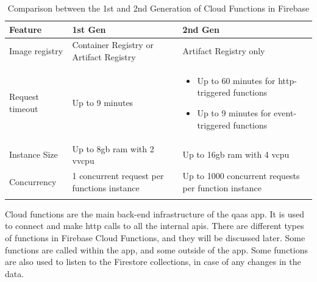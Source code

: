 \begin{longtable}{|p{5cm}|p{5.5cm}|p{5.5cm}|}
      \hline
      \rowcolor{blue!20}
      Feature         & 1st Gen                                                     & 2nd Gen                                                       \\
      \endfirsthead
      \hline
      Image registry  & Container Registry or Artifact Registry                     & Artifact Registry only                                        \\
      \hline
      Request timeout & Up to 9 minutes                                             & \begin{itemize}
                                                                                            \item Up to 60 minutes for \acrshort{http}-triggered functions
                                                                                            \item Up to 9 minutes for event-triggered functions
                                                                                      \end{itemize} \\
      \hline
      Instance Size   & Up to 8\acrshort{gb} \acrshort{ram} with 2 v\acrshort{vcpu} & Up to 16\acrshort{gb} \acrshort{ram} with 4 \acrshort{vcpu}   \\
      \hline
      Concurrency     & 1 concurrent request per functions instance                 & Up to 1000 concurrent requests per function instance          \\
      \hline
      \caption{Comparison between the 1st and 2nd Generation of Cloud Functions in Firebase}
      \label{tab:restvsoap}
\end{longtable}


Cloud functions are the main back-end infrastructure of the \acrshort{qaas} app. It is used to connect
and make \acrshort{http} calls to all the internal \acrshort{api}s. There are different types of
functions in Firebase Cloud Functions, and they will be discussed later. Some functions are called within
the app, and some outside of the app. Some functions are also used to listen to the Firestore collections,
in case of any changes in the data.




